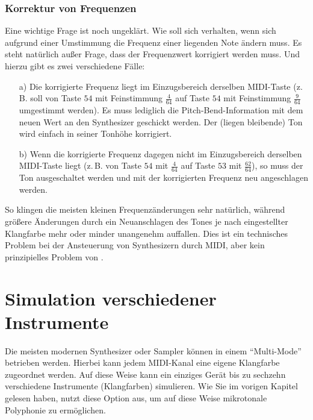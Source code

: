 \subsection{Korrektur von Frequenzen}\label{sec:korr-von-freq}
Eine wichtige Frage ist noch ungeklärt. Wie soll sich \mutabor{}
verhalten, wenn sich aufgrund einer Umstimmung die Frequenz einer
liegenden Note ändern muss. Es steht natürlich außer Frage, dass der
Frequenzwert korrigiert werden muss. Und hierzu gibt es zwei
verschiedene Fälle:

\begin{itemize}
\item[a)] Die korrigierte Frequenz liegt im Einzugsbereich derselben
  MIDI-Taste (z.\,B. soll von Taste $54$ mit Feinstimmung $\frac{4}{64}$
  auf Taste $54$ mit Feinstimmung $\frac{9}{64}$ umgestimmt werden).
  Es muss lediglich die Pitch-Bend-Information mit dem neuen Wert an
  den Synthesizer geschickt werden. Der (liegen bleibende) Ton wird
  einfach in seiner Tonhöhe korrigiert.
\item[b)] Wenn die korrigierte Frequenz dagegen nicht im
  Einzugsbereich derselben MIDI-Taste liegt (z.\,B. von Taste $54$ mit
  $\frac{4}{64}$ auf Taste $53$ mit $\frac{62}{64}$), so muss der Ton
  ausgeschaltet werden und mit der korrigierten Frequenz neu
  angeschlagen werden.
\end{itemize}

So klingen die meisten kleinen Frequenzänderungen sehr natürlich,
während größere Änderungen durch ein Neuanschlagen des Tones je nach
eingestellter Klangfarbe mehr oder minder unangenehm auffallen. Dies
ist ein technisches Problem bei der Ansteuerung von Synthesizern durch
MIDI, aber kein prinzipielles Problem von \mutabor{}.

\chapter{Simulation verschiedener Instrumente}\label{cha:simul-versch-instr}
Die meisten modernen Synthesizer oder Sampler können in einem
"`Multi-Mode"' betrieben werden. 
Hierbei kann jedem MIDI-Kanal eine
eigene Klangfarbe zugeordnet werden. Auf diese Weise kann ein einziges
Gerät bis zu sechzehn verschiedene Instrumente (Klangfarben) simulieren. 
Wie Sie im vorigen Kapitel gelesen haben, nutzt \mutabor{} diese Option aus, 
um auf diese Weise mikrotonale Polyphonie zu ermöglichen.


